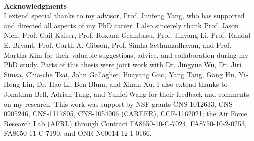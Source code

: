 ~\\[1in] %
\textbf{\Huge Acknowledgments}\\

\noindent 
I extend special thanks to my advisor, Prof. Junfeng Yang, who has supported and directed all aspects of my PhD career. I also sincerely thank Prof. Jason Nieh, Prof. Gail Kaiser, Prof. Roxana Geambasu, Prof. Jinyang Li, Prof. Randal E. Bryant, Prof. Garth A. Gibson, Prof. Simha Sethumadhavan, and Prof. Martha Kim for their valuable suggestions, advice, and collaboration during my PhD study. Parts of this thesis were joint work with Dr. Jingyue Wu, Dr. Jiri Simsa, Chia-che Tsai, John Gallagher, Huayang Guo, Yang Tang, Gang Hu, Yi-Hong Lin, Dr. Hao Li,  Ben Blum, and Xinan Xu. I also extend thanks to Jonathan Bell, Adrian Tang, and Yunfei Wang for their feedback and comments on my research. This work was support by NSF grants CNS-1012633, CNS-0905246, CNS-1117805, CNS-1054906 (CAREER), CCF-1162021; the Air Force Research Lab (AFRL) through Contract FA8650-10-C-7024, FA8750-10-2-0253, FA8650-11-C-7190; and ONR N00014-12-1-0166.